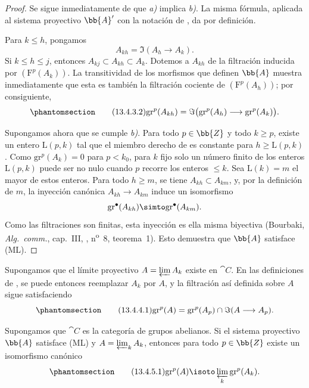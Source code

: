 \documentclass[oneside]{amsart}
\renewcommand{\leq}{\leqslant}
\renewcommand{\geq}{\geqslant}
\newcommand{\oldpage}[2][]{{\marginnote{\normalfont\textbf{#1}~|~#2}}\ignorespaces}
\let\EGAOriginalLabel\label
\renewcommand{\label}[1]{\phantomsection\EGAOriginalLabel{#1}}
\begin{document}
\begin{proof}
Se sigue inmediatamente de  que \emph{a)} implica
\emph{b)}. La misma fórmula, aplicada al sistema proyectivo
$\bb{A}'$ con la notación de , da
 por definición.

Para $k\leq h$, pongamos
\[
  A_{kh}=\Im(A_h\longrightarrow A_k).
\]
Si $k\leq h\leq j$, entonces
$A_{kj}\subset A_{kh}\subset A_k$.
Dotemos a $A_{kh}$ de la filtración inducida por
$(\mathrm{F}^p(A_k))$.
La transitividad de los morfismos que definen $\bb{A}$ muestra
inmediatamente que esta es también la filtración cociente de
$(\mathrm{F}^p(A_h))$; por consiguiente,
\begin{equation}
\label{0.13.4.3.2}
\tag{13.4.3.2}
  \mathrm{gr}^p(A_{kh})
  =
  \Im\bigl(
    \mathrm{gr}^p(A_h)\longrightarrow\mathrm{gr}^p(A_k)
  \bigr).
\end{equation}

\oldpage[0\textsubscript{III}]{71}
Supongamos ahora que se cumple \emph{b)}.
Para todo $p\in\bb{Z}$ y todo $k\geq p$, existe un entero
$\mathrm{L}(p,k)$ tal que el miembro derecho de
 es constante para $h\geq\mathrm{L}(p,k)$.
Como $\mathrm{gr}^p(A_k)=0$ para $p<k_0$, para $k$ fijo solo
un número finito de los enteros $\mathrm{L}(p,k)$ puede ser no nulo cuando
$p$ recorre los enteros $\leq k$.
Sea $\mathrm{L}(k)=m$ el mayor de estos enteros.
Para todo $h\geq m$, se tiene
$A_{kh}\subset A_{km}$, y, por la definición de $m$, la inyección
canónica
$A_{kh}\longrightarrow A_{km}$ induce un isomorfismo
\[
  \mathrm{gr}^\bullet(A_{kh})
  \simto
  \mathrm{gr}^\bullet(A_{km}).
\]
Como las filtraciones son finitas, esta inyección es ella misma biyectiva
(Bourbaki, \emph{Alg.\ comm.}, cap.~III, ,
n\textsuperscript{o}~8, teorema~1).
Esto demuestra que $\bb{A}$ satisface (ML).
\end{proof}

\begin{env}[13.4.4]
\label{0.13.4.4}
Supongamos que el límite proyectivo
$A=\varprojlim A_k$ existe en $\cat{C}$.
En las definiciones de , se puede entonces reemplazar $A_k$
por $A$, y la filtración así definida sobre $A$ sigue satisfaciendo
\begin{equation}
\label{0.13.4.4.1}
\tag{13.4.4.1}
  \mathrm{gr}^p(A)
  =
  \mathrm{gr}^p(A_p)
  \cap
  \Im(A\longrightarrow A_p).
\end{equation}
\end{env}

\begin{corollary}[13.4.5]
\label{0.13.4.5}
Supongamos que $\cat{C}$ es la categoría de grupos abelianos.
Si el sistema proyectivo $\bb{A}$ satisface \textup{(ML)} y
$A=\varprojlim_k A_k$, entonces para todo $p\in\bb{Z}$ existe un
isomorfismo canónico
\begin{equation}
\label{0.13.4.5.1}
\tag{13.4.5.1}
  \mathrm{gr}^p(A)
  \isoto
  \varprojlim_k\mathrm{gr}^p(A_k).
\end{equation}
\end{corollary}
\end{document}
